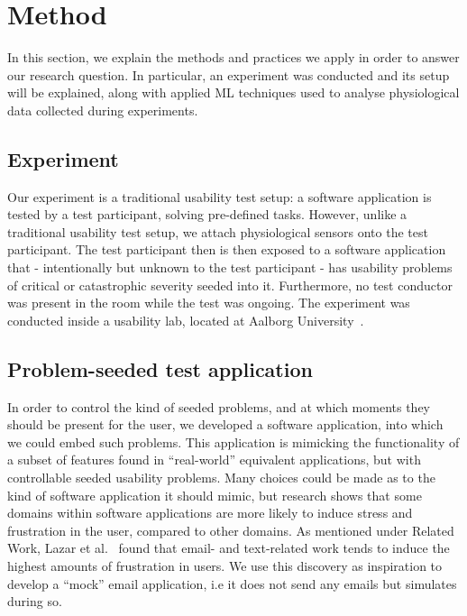 \section{Method}\label{sec:method}
In this section, we explain the methods and practices we apply in order to answer our research question. In particular, an
experiment was conducted and its setup will be explained, along with applied ML techniques used to
analyse physiological data collected during experiments.

\subsection{Experiment}
Our experiment is a traditional usability test setup: a software application is tested by a test participant, solving pre-defined tasks. 
However, unlike a traditional usability test setup, we attach physiological sensors onto the test participant.
The test participant then is then exposed to a software application that - intentionally but unknown to the test participant - has usability problems of critical or catastrophic severity seeded into it. 
Furthermore, no test conductor was present in the room while the test was ongoing.
The experiment was conducted inside a usability lab, located at Aalborg University~\cite{usability_lab_cassiopeia}.

\subsection{Problem-seeded test application}
In order to control the kind of seeded problems, and at which moments they should be present for the user, we developed a software
application, into which we could embed such problems. This application is mimicking the functionality of a subset of
features found in ``real-world'' equivalent applications, but with controllable seeded usability problems.  Many choices could be
made as to the kind of software application it should mimic, but research shows that some domains within software
applications are more likely to induce stress and frustration in the user, compared to other domains.  As mentioned
under Related Work, Lazar et al.~\cite{frustration_with_computers} found that email- and text-related work tends to
induce the highest amounts of frustration in users. We use this discovery as inspiration to develop a ``mock'' email
application, i.e it does not send any emails but simulates during so.

